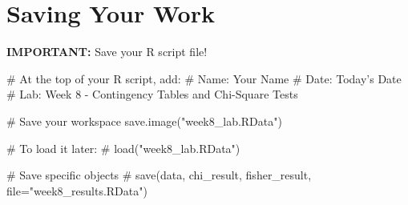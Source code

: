 \documentclass[11pt]{article}
\begin{document}
\vspace{2cm}

\section{Saving Your Work}

\textbf{IMPORTANT:} Save your R script file!

\begin{rcode}
# At the top of your R script, add:
# Name: Your Name
# Date: Today's Date
# Lab: Week 8 - Contingency Tables and Chi-Square Tests

# Save your workspace
save.image("week8_lab.RData")

# To load it later:
# load("week8_lab.RData")

# Save specific objects
# save(data, chi_result, fisher_result, file="week8_results.RData")
\end{rcode}
\end{document}
